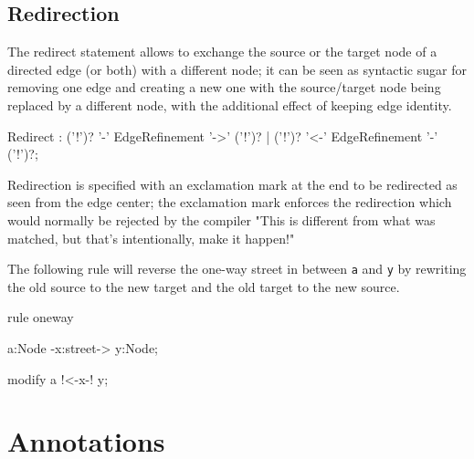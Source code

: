 \subsection{Redirection} \label{sec:redirect}
The redirect statement allows to exchange the source or the target node of a directed edge (or both) with a different node;
it can be seen as syntactic sugar for removing one edge and creating a new one with the source/target node being replaced by a different node, with the additional effect of keeping edge identity.

\begin{rail}
Redirect : ('!')? '-' EdgeRefinement '->' ('!')? | ('!')? '<-' EdgeRefinement '-' ('!')?;
\end{rail}

Redirection is specified with an exclamation mark at the end to be redirected as seen from the edge center;
the exclamation mark enforces the redirection which would normally be rejected by the compiler "This is different from what was matched, but that's intentionally, make it happen!"

\begin{example}
The following rule will reverse the one-way street in between \texttt{a} and \texttt{y} by rewriting the old source to the new target and the old target to the new source.
\begin{grgen}
rule oneway {
  a:Node -x:street-> y:Node;

  modify {
    a !<-x-! y;
  }
}
\end{grgen}
\end{example}


\section{Annotations}
\label{annotations}

